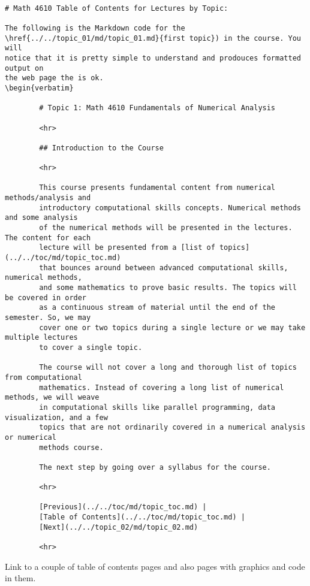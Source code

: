 \documentclass[10pt,fleqn]{article}
\begin{document}
\begin{verbatim}

# Math 4610 Table of Contents for Lectures by Topic:

The following is the Markdown code for the
\href{../../topic_01/md/topic_01.md}{first topic}) in the course. You will
notice that it is pretty simple to understand and prodouces formatted output on
the web page the is ok.
\begin{verbatim}

        # Topic 1: Math 4610 Fundamentals of Numerical Analysis 

        <hr>

        ## Introduction to the Course

        <hr>

        This course presents fundamental content from numerical methods/analysis and
        introductory computational skills concepts. Numerical methods and some analysis
        of the numerical methods will be presented in the lectures. The content for each
        lecture will be presented from a [list of topics](../../toc/md/topic_toc.md)
        that bounces around between advanced computational skills, numerical methods,
        and some mathematics to prove basic results. The topics will be covered in order
        as a continuous stream of material until the end of the semester. So, we may
        cover one or two topics during a single lecture or we may take multiple lectures
        to cover a single topic.

        The course will not cover a long and thorough list of topics from computational
        mathematics. Instead of covering a long list of numerical methods, we will weave
        in computational skills like parallel programming, data visualization, and a few
        topics that are not ordinarily covered in a numerical analysis or numerical
        methods course.

        The next step by going over a syllabus for the course.

        <hr>

        [Previous](../../toc/md/topic_toc.md) | 
        [Table of Contents](../../toc/md/topic_toc.md) | 
        [Next](../../topic_02/md/topic_02.md)

        <hr>

\end{verbatim}




Link to a couple of table of contents pages and also pages with graphics and
code in them.
\end{document}
